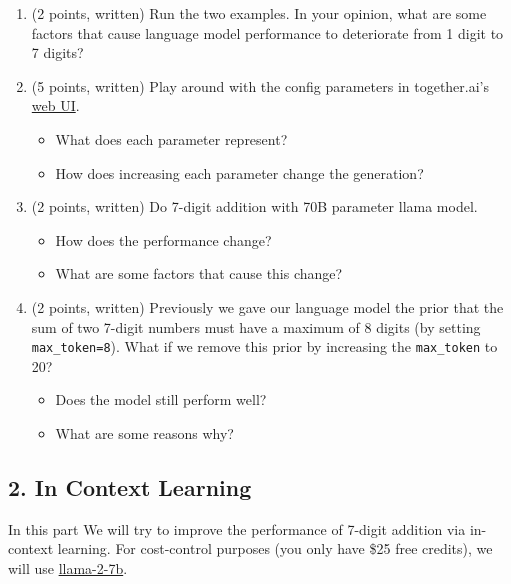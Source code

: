 \documentclass{article}
\theoremstyle{case}
\theoremstyle{definition}
\begin{document}
\begin{enumerate}[label=\alph*.]
    \item (2 points, written) Run the two examples. In your opinion, what are some factors that cause language model performance to deteriorate from 1 digit to 7 digits?
    \newpage
    \item (5 points, written) Play around with the config parameters in together.ai's \href{https://api.together.xyz/playground/language/togethercomputer/llama-2-7b}{web UI}.
    \begin{itemize}
        \item What does each parameter represent?
        \item How does increasing each parameter change the generation?
    \end{itemize} 
    \newpage
    \item (2 points, written) Do 7-digit addition with 70B parameter llama model. 
    \begin{itemize}
        \item How does the performance change?
        \item What are some factors that cause this change?
    \end{itemize}
    \newpage
    \item (2 points, written) Previously we gave our language model the prior that the sum of two 7-digit numbers must have a maximum of 8 digits (by setting \texttt{max\_token=8}). What if we remove this prior by increasing the \texttt{max\_token} to 20? 
    \begin{itemize}
        \item  Does the model still perform well?
        \item What are some reasons why?
    \end{itemize}
\end{enumerate}

\newpage
\subsection*{2. In Context Learning}

In this part We will try to improve the performance of 7-digit addition via in-context learning.
For cost-control purposes (you only have \$25 free credits), we will use \href{https://api.together.xyz/playground/language/togethercomputer/llama-2-7b}{llama-2-7b}.
\end{document}
